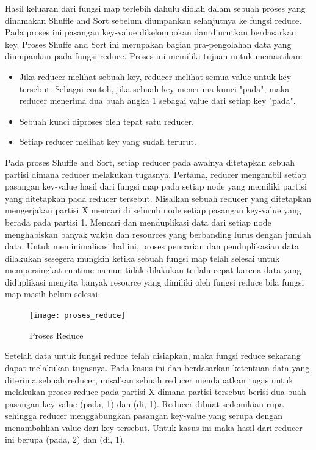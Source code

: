 Hasil keluaran dari fungsi map terlebih dahulu diolah dalam sebuah proses yang dinamakan Shuffle and Sort sebelum diumpankan selanjutnya ke fungsi reduce. Pada proses ini pasangan key-value dikelompokan dan diurutkan berdasarkan key. Proses Shuffe and Sort ini merupakan bagian pra-pengolahan data yang diumpankan pada fungsi reduce. Proses ini memiliki tujuan untuk memastikan:

\begin{itemize}
	\item Jika reducer melihat sebuah key, reducer melihat semua value untuk key tersebut. Sebagai contoh, jika sebuah key menerima kunci "pada", maka reducer menerima dua buah angka 1 sebagai value dari setiap key "pada".
	\item Sebuah kunci diproses oleh tepat satu reducer.
	\item Setiap reducer melihat key yang sudah terurut.
\end{itemize}

Pada proses Shuffle and Sort, setiap reducer pada awalnya ditetapkan sebuah partisi dimana reducer melakukan tugasnya. Pertama, reducer mengambil setiap pasangan key-value hasil dari fungsi map pada setiap node yang memiliki partisi yang ditetapkan pada reducer tersebut. Misalkan sebuah reducer yang ditetapkan mengerjakan partisi X mencari di seluruh node setiap pasangan key-value yang berada pada partisi 1. Mencari dan menduplikasi data dari setiap node menghabiskan banyak waktu dan resources yang berbanding lurus dengan jumlah data. Untuk meminimalisasi hal ini, proses pencarian dan penduplikasian data dilakukan sesegera mungkin ketika sebuah fungsi map telah selesai untuk mempersingkat runtime namun tidak dilakukan terlalu cepat karena data yang diduplikasi menyita banyak resource yang dimiliki oleh fungsi reduce bila fungsi map masih belum selesai.

\begin{figure}[H]
\centering
\texttt{[image: proses\_reduce]}
\caption[Proses Reduce]{Proses Reduce}
\label{fig:Proses Reduce}
\end{figure}

Setelah data untuk fungsi reduce telah disiapkan, maka fungsi reduce sekarang dapat melakukan tugasnya. Pada kasus ini dan berdasarkan ketentuan data yang diterima sebuah reducer, misalkan sebuah reducer mendapatkan tugas untuk melakukan proses reduce pada partisi X dimana partisi tersebut berisi dua buah pasangan key-value (pada, 1) dan (di, 1). Reducer dibuat sedemikian rupa sehingga reducer menggabungkan pasangan key-value yang serupa dengan menambahkan value dari key tersebut. Untuk kasus ini maka hasil dari reducer ini berupa (pada, 2) dan (di, 1).

